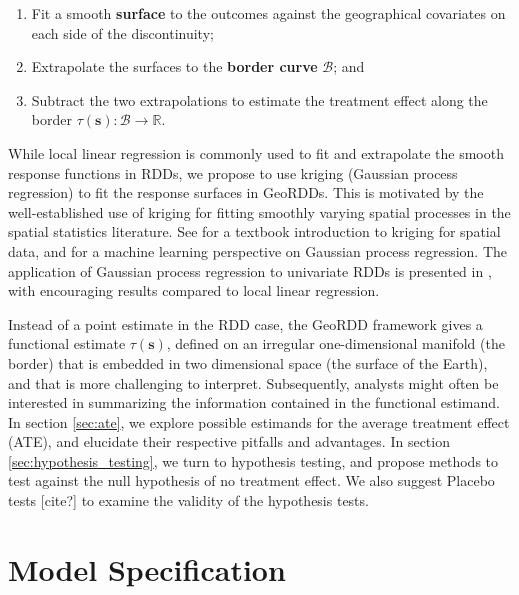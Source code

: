 \documentclass[letter]{article}
\providecommand{\tightlist}{%
      \setlength{\itemsep}{0pt}\setlength{\parskip}{0pt}}
\newcommand{\svec}{\mathbold{s}}
\newcommand{\border}{\mathcal{B}}
\providecommand{\tightlist}{%
  	  \setlength{\itemsep}{0pt}\setlength{\parskip}{0pt}}
\renewcommand{\cite}[1]{\citep{#1}}
\begin{document}
\begin{enumerate}
\def\labelenumi{\arabic{enumi}.}
\tightlist
\item
  Fit a smooth \textbf{surface} to the outcomes against the geographical covariates on each side of the discontinuity;
\item
  Extrapolate the surfaces to the \textbf{border curve} \(\border\); and
\item
  Subtract the two extrapolations to estimate the treatment effect along the border \(\tau(\svec): \border \rightarrow \mathbb{R}\).
\end{enumerate}
    


    	While local linear regression is commonly used to fit and extrapolate the smooth response functions in RDDs, we propose to use kriging (Gaussian process regression) to fit the response surfaces in GeoRDDs.
This is motivated by the well-established use of kriging for fitting smoothly varying spatial processes in the spatial statistics literature.
See \cite{banerjee2014hierarchical} for a textbook introduction to kriging for spatial data, and \cite{rasmussen2006gaussian} for a machine learning perspective on Gaussian process regression.
The application of Gaussian process regression to univariate RDDs is presented in \cite{Branson:2017qy}, with encouraging results compared to local linear regression.
    


    	Instead of a point estimate in the RDD case, the GeoRDD framework gives a functional estimate \(\tau(\svec)\), defined on an irregular one-dimensional manifold (the border) that is embedded in two dimensional space (the surface of the Earth), and that is more challenging to interpret.
Subsequently, analysts might often be interested in summarizing the information contained in the functional estimand.
In section \ref{sec:ate}, we explore possible estimands for the average treatment effect (ATE), and elucidate their respective pitfalls and advantages.
In section \ref{sec:hypothesis_testing}, we turn to hypothesis testing, and propose methods to test against the null hypothesis of no treatment effect.
We also suggest Placebo tests {[}cite?{]} to examine the validity of the hypothesis tests.
    


    	\section{Model Specification}\label{model-specification}
\end{document}
